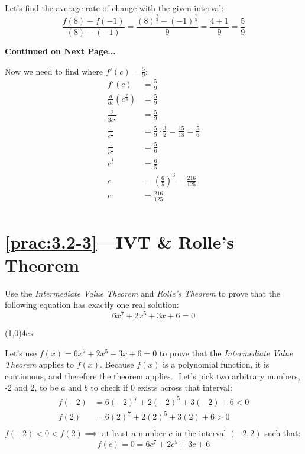 \documentclass{MathNotes}
\newcommand{\br}{
\begin{center}
\line(1,0){4ex}
\end{center}}
\newcommand{\continued}{
\mbox{}
\vfill
\textbf{Continued on Next Page...}\newpage
}
\begin{document}
Let's find the average rate of change with the given interval:
\begin{displaymath}
    \frac{f(8)-f(-1)}{(8)-(-1)}=\frac{(8)^{\frac{2}{3}}-(-1)^{\frac{2}{3}}}{9}
    =\frac{4+1}{9}=\frac{5}{9}
\end{displaymath}
\continued
Now we need to find where $f'(c)=\frac{5}{9}$:
\begin{align*}
    f'(c)&=\frac{5}{9}\\
    \frac{d}{dc}(c^\frac{2}{3})&=\frac{5}{9}\\
    \frac{2}{3c^{\frac{1}{3}}}&=\frac{5}{9}\\
    \frac{1}{c^{\frac{1}{3}}}&=\frac{5}{9}\cdot\frac{3}{2}=\frac{15}{18}=\frac{5}{6}\\
    \frac{1}{c^{\frac{1}{3}}}&=\frac{5}{6}\\
    c^{\frac{1}{3}}&=\frac{6}{5}\\
    c&=(\frac{6}{5})^3=\frac{216}{125}\\
    c&=\frac{216}{125}\\
\end{align*}

\section*{\ref{prac:3.2-3}---IVT \& Rolle's Theorem}\label{ans:3.2-3}
Use the \textit{Intermediate Value Theorem} and \textit{Rolle's Theorem} to
prove that the following equation has exactly one real solution:
$$6x^7+2x^5+3x+6=0$$
\br
Let's use $f(x)=6x^7+2x^5+3x+6=0$ to prove that the \textit{Intermediate
Value Theorem} applies to $f(x)$. Because $f(x)$ is a polynomial function, it
is continuous, and therefore the theorem applies.
\newline$ $\newline
Let's pick two arbitrary numbers, -2 and 2, to be $a$ and $b$ to check if $0$ exists
across that interval:
\begin{align*}
    f(-2)&=6(-2)^7+2(-2)^5+3(-2)+6 < 0\\
    f(2)&=6(2)^7+2(2)^5+3(2)+6 > 0\\
\end{align*}
$f(-2)<0<f(2)\implies$ at least a number $c$ in the interval $(-2, 2)$ such
that: $$f(c)=0=6c^7+2c^5+3c+6$$
\end{document}
